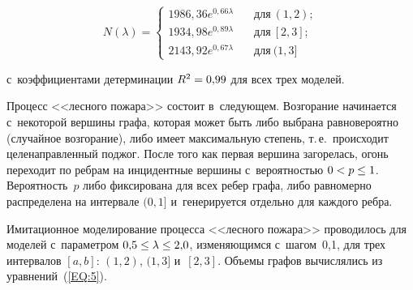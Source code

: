 \begin{multicols}{2}
\noindent
\begin{equation}
\label{EQ:5}
N(\lambda)=\begin{cases}
1986{,}36 e^{0,66\lambda} & \quad \mbox{для}~(1,2);\\
1934{,}98 e^{0,89\lambda} & \quad \mbox{для}~[2,3];\\
2143{,}92 e^{0,67\lambda} & \quad \mbox{для}~(1,3]
\end{cases}
\end{equation}

\noindent 
с~коэффициентами детерминации $R^2\hm=0{,}99$ для всех трех моделей.


Процесс <<лесного пожара>> со\-сто\-ит в~сле\-ду\-ющем. Возгорание начинается с~некоторой
вершины графа, которая может быть либо выбрана равновероятно (случайное возгорание),
либо имеет максимальную степень, т.\,е.\ происходит це\-ле\-на\-прав\-лен\-ный поджог. После того
как первая вершина загорелась, огонь переходит по реб\-рам на инцидентные вершины 
с~ве\-ро\-ят\-ностью $0\hm<p\hm\leq 1$. Ве\-ро\-ят\-ность~$p$ 
либо фиксирована для всех ребер графа, либо
рав\-но\-мер\-но распределена на интервале $(0,1]$ и~генерируется отдельно для 
каж\-до\-го ребра.

Имитационное моделирование процесса <<лесного пожара>> проводилось для моделей 
с~па\-ра\-мет\-ром $0{,}5\hm\leq\lambda\hm\leq 2{,}0$, изменяющимся с~шагом~0,1, 
для трех интервалов
$[a,b]$: $(1,2)$, $(1,3]$ и~$[2,3]$. Объемы графов вы\-чис\-ля\-лись из 
уравнений~(\ref{EQ:5}).

\setcounter{table}{1}

\begin{table*}\small
\hspace*{3mm}\begin{minipage}[t]{75mm}
\begin{center}
\vspace*{2ex}




\end{center}
\end{minipage}
\end{table*}
\end{multicols}
